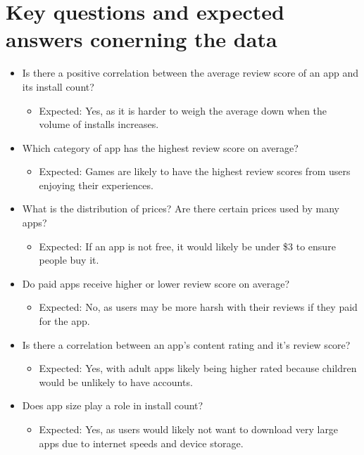 \documentclass[12pt]{report}\usepackage[]{graphicx}\usepackage[]{xcolor}
\begin{document}
\section{Key questions and expected answers conerning the data}\label{sec:questions} %
\begin{itemize}
    \item Is there a positive correlation between the average review score of an app and its install count? 
    \begin{itemize}
        \item Expected: Yes, as it is harder to weigh the average down when the volume of installs increases.
    \end{itemize}
    \item Which category of app has the highest review score on average?
    \begin{itemize}
        \item Expected: Games are likely to have the highest review scores from users enjoying their experiences.
    \end{itemize}
    \item What is the distribution of prices? Are there certain prices used by many apps?
    \begin{itemize}
        \item Expected: If an app is not free, it would likely be under \$3 to ensure people buy it.
    \end{itemize}
    \item Do paid apps receive higher or lower review score on average?
    \begin{itemize}
        \item Expected: No, as users may be more harsh with their reviews if they paid for the app.
    \end{itemize}
    \item Is there a correlation between an app's content rating and it's review score?
    \begin{itemize}
        \item Expected: Yes, with adult apps likely being higher rated because children would be unlikely to have accounts.
    \end{itemize}
    \item Does app size play a role in install count?
    \begin{itemize}
        \item Expected: Yes, as users would likely not want to download very large apps due to internet speeds and device storage.
    \end{itemize}
\end{itemize}
\end{document}
